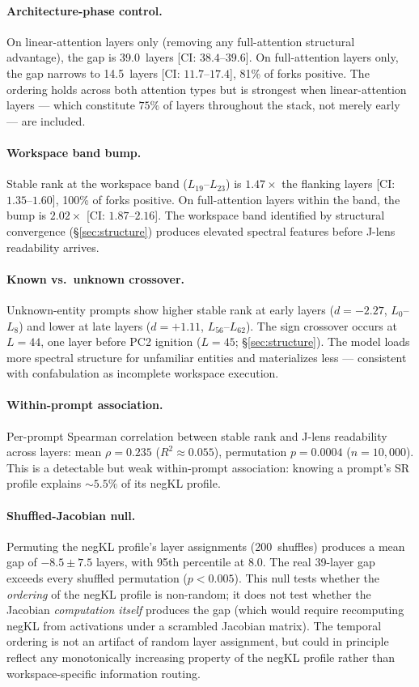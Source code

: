 \documentclass[11pt,a4paper]{article}
\begin{document}
\paragraph{Architecture-phase control.} On linear-attention layers only
(removing any full-attention structural advantage), the gap is
39.0~layers [CI: $38.4$--$39.6$]. On full-attention layers only, the
gap narrows to 14.5~layers [CI: $11.7$--$17.4$], 81\% of forks
positive. The ordering holds across both attention types but is
strongest when linear-attention layers --- which constitute $75\%$ of
layers throughout the stack, not merely early --- are included.

\paragraph{Workspace band bump.} Stable rank at the workspace band
($L_{19}$--$L_{23}$) is $1.47\times$ the flanking layers
[CI: $1.35$--$1.60$], 100\% of forks positive. On full-attention layers
within the band, the bump is $2.02\times$ [CI: $1.87$--$2.16$]. The
workspace band identified by structural convergence
(\S\ref{sec:structure}) produces elevated spectral features before
J-lens readability arrives.

\paragraph{Known vs.\ unknown crossover.} Unknown-entity prompts show
higher stable rank at early layers ($d{=}{-}2.27$, $L_0$--$L_8$) and
lower at late layers ($d{=}{+}1.11$, $L_{56}$--$L_{62}$). The sign
crossover occurs at $L{=}44$, one layer before PC2 ignition
($L{=}45$; \S\ref{sec:structure}). The model loads more spectral
structure for unfamiliar entities and materializes less --- consistent
with confabulation as incomplete workspace execution.

\paragraph{Within-prompt association.} Per-prompt Spearman correlation
between stable rank and J-lens readability across layers: mean
$\rho{=}0.235$ ($R^2 \approx 0.055$), permutation $p{=}0.0004$
($n{=}10{,}000$). This is a detectable but weak within-prompt
association: knowing a prompt's SR profile explains ${\sim}5.5\%$ of
its negKL profile.

\paragraph{Shuffled-Jacobian null.} Permuting the negKL profile's
layer assignments (200~shuffles) produces a mean gap of $-8.5 \pm 7.5$
layers, with 95th percentile at $8.0$. The real 39-layer gap exceeds
every shuffled permutation ($p < 0.005$). This null tests whether the
\emph{ordering} of the negKL profile is non-random; it does not test
whether the Jacobian \emph{computation itself} produces the gap
(which would require recomputing negKL from activations under a
scrambled Jacobian matrix). The temporal ordering is not an artifact
of random layer assignment, but could in principle reflect any
monotonically increasing property of the negKL profile rather than
workspace-specific information routing.
\end{document}
